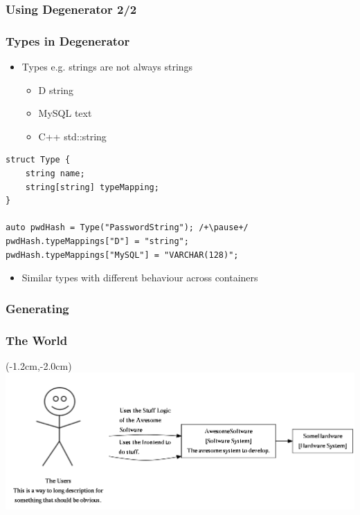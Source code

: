 \documentclass[xelatex,13pt]{beamer}
\begin{document}
\begin{frame}
	\frametitle{Using Degenerator 2/2}
	
	\pause
	
	\pause
	
	\pause
	
\end{frame}

\begin{frame}[fragile]
	\frametitle{Types in Degenerator}
	\begin{itemize}
		\item Types \pause e.g. strings are not always strings
		\pause
		\begin{itemize}
			\item D string
			\item MySQL text
			\item C++ std::string
		\end{itemize}
	\end{itemize}
	\pause
	\begin{lstlisting}[basicstyle=\scriptsize]
struct Type {
    string name;
    string[string] typeMapping;
}

auto pwdHash = Type("PasswordString"); /+\pause+/
pwdHash.typeMappings["D"] = "string";
pwdHash.typeMappings["MySQL"] = "VARCHAR(128)";
\end{lstlisting}
	\vspace{-1cm}
\begin{itemize}
	\item Similar types with different behaviour across containers
\end{itemize}
\end{frame}

\begin{frame}
	\frametitle{Generating}
	
\end{frame}

\begin{frame}
	\frametitle{The World}
	\begin{textblock*}{0cm}(-1.2cm,-2.0cm)
		\includegraphics[width=1.0\paperwidth]{theworld.png}
	\end{textblock*}
\end{frame}
\end{document}
